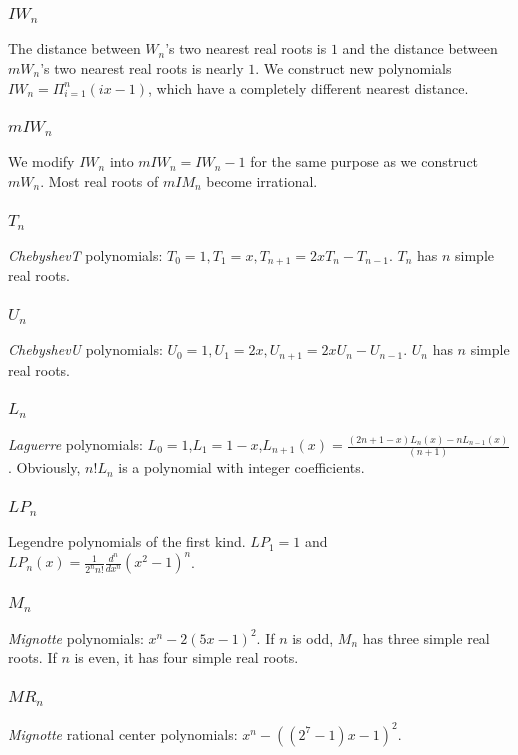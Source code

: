  \subsubsection{$IW_n$}
 The distance between  $W_n$'s two  nearest real roots  is  $1$ and the distance between $mW_n$'s two nearest real roots  is nearly $1$. %
 We construct new polynomials $IW_n=\Pi_{i=1}^n(ix-1)$, which have a completely different nearest distance. %
 \subsubsection{$ mIW_n$ }
 We modify $IW_n$  into $mIW_n=IW_n-1$ for the same purpose  as we construct $mW_n$. Most real roots of $mIM_n$  become irrational.
 \subsubsection{$T_n$} {\it ChebyshevT} polynomials: $T_0=1,T_1=x,T_{n+1}=2xT_n-T_{n-1}$. $T_n$ has $n$ simple real roots.
 \subsubsection{$U_n$} {\it ChebyshevU} polynomials: $U_0=1,U_1=2x,U_{n+1}=2xU_n-U_{n-1}$. $U_n$ has $n$ simple real roots.
 \subsubsection{$L_n$}
 {\it Laguerre}  polynomials: $L_0=1$,$L_1=1-x$,$L_{n+1}(x)=\frac{  (2n+1-x )L_n(x)-  nL_{n-1 }(x)}{(n+1) }$.
Obviously, $n!L_n$ is a polynomial with integer coefficients.
 \subsubsection{$LP_n$} Legendre polynomials of the first kind. $LP_1=1$ and $LP_n(x)=\frac{1}{2^nn!}\frac{d^n}{dx^n}(x^2-1)^n$.
 \subsubsection{$M_n$} {\it Mignotte} polynomials: $x^n-2(5x-1)^2$. If $n$ is odd, $M_n$ has three simple real roots. If $n$ is even, it has four simple real roots.

\subsubsection{$MR_n$}{\it Mignotte} rational center polynomials: $ x^n-((2^7-1)x-1)^2$.
	
